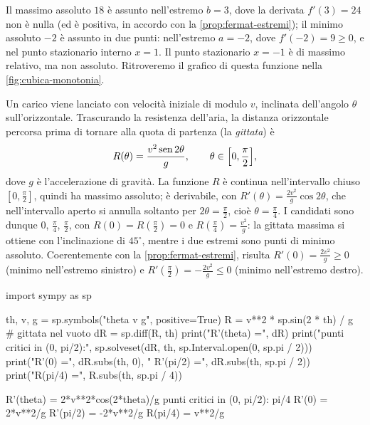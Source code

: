 Il massimo assoluto $18$ è assunto nell'estremo $b=3$, dove la derivata
$f'(3)=24$ non è nulla (ed è positiva, in accordo con la \cref{prop:fermat-estremi}); il
minimo assoluto $-2$ è assunto in due punti: nell'estremo $a=-2$, dove $f'(-2)=9\ge0$,
e nel punto stazionario interno $x=1$. Il punto stazionario $x=-1$ è di massimo
relativo, ma non assoluto. Ritroveremo il grafico di questa funzione nella
\cref{fig:cubica-monotonia}.

\begin{esempio}\label{es:gittata}
Un carico viene lanciato con velocità iniziale di modulo $v$, inclinata dell'angolo
$\theta$ sull'orizzontale. Trascurando la resistenza dell'aria, la distanza orizzontale
percorsa prima di tornare alla quota di partenza (la \emph{gittata}) è
\begin{equation}\label{eq:gittata}
  R(\theta)=\frac{v^{2}\operatorname{sen}2\theta}{g}, \qquad \theta\in\Bigl[0,\frac\pi2\Bigr],
\end{equation}
dove $g$ è l'accelerazione di gravità. La funzione $R$ è continua nell'intervallo
chiuso $[0,\frac\pi2]$, quindi ha massimo assoluto; è derivabile, con
$R'(\theta)=\frac{2v^{2}}{g}\cos2\theta$, che nell'intervallo aperto si annulla soltanto
per $2\theta=\frac\pi2$, cioè $\theta=\frac\pi4$. I candidati sono dunque $0$,
$\frac\pi4$, $\frac\pi2$, con $R(0)=R(\frac\pi2)=0$ e $R(\frac\pi4)=\frac{v^{2}}g$: la
gittata massima si ottiene con l'inclinazione di $45^{\circ}$, mentre i due estremi
sono punti di minimo assoluto. Coerentemente con la \cref{prop:fermat-estremi}, risulta
$R'(0)=\frac{2v^{2}}g\ge0$ (minimo nell'estremo sinistro) e
$R'(\frac\pi2)=-\frac{2v^{2}}g\le0$ (minimo nell'estremo destro).
\end{esempio}

\begin{python}
import sympy as sp

th, v, g = sp.symbols("theta v g", positive=True)
R = v**2 * sp.sin(2 * th) / g             # gittata nel vuoto
dR = sp.diff(R, th)
print("R'(theta) =", dR)
print("punti critici in (0, pi/2):",
      sp.solveset(dR, th, sp.Interval.open(0, sp.pi / 2)))
print("R'(0) =", dR.subs(th, 0),
      "   R'(pi/2) =", dR.subs(th, sp.pi / 2))
print("R(pi/4) =", R.subs(th, sp.pi / 4))
\end{python}
\begin{risultato}
R'(theta) = 2*v**2*cos(2*theta)/g
punti critici in (0, pi/2): {pi/4}
R'(0) = 2*v**2/g    R'(pi/2) = -2*v**2/g
R(pi/4) = v**2/g
\end{risultato}

